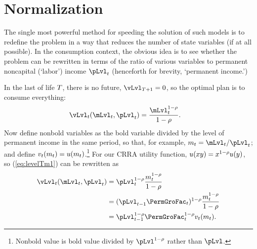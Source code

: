 \hypertarget{normalization}{}
\section{Normalization}\label{sec:normalization}

The single most powerful method for speeding the solution of such models is to redefine the problem in a way that reduces the number of state variables (if at all possible).  In the consumption context, the obvious idea is to see whether the problem can be rewritten in terms of the ratio of various variables to permanent noncapital (`labor') income $\pLvl_{\prd}$ (henceforth for brevity, `permanent income.')

In the last {\interval} of life $T$, there is no future, ${\vLvl}_{\trmT+1} = 0$, so the optimal plan is to consume everything:
\begin{equation}\begin{gathered}\begin{aligned}
      {\vLvl}_{\prdT}(\mLvl_{\prdT},\pLvl_{\prdT})  & = \frac{\mLvl_{\prdT}^{1-\CRRA}}{1-\CRRA}. \label{eq:levelTm1}
    \end{aligned}\end{gathered}\end{equation}
Now define nonbold variables as the bold variable divided by the level of permanent income in the same period, so that, for example, ${\mNrm}_{\prdT}=\mLvl_{\prdT}/\pLvl_{\prdT}$; and define $v_{t}({m}_{t}) = u({m}_{t})$.\footnote{Nonbold value is bold value divided by $\pLvl^{1-\CRRA}$ rather than $\pLvl$.}  For our CRRA utility function, $u(xy)=x^{1-\rho}u(y)$, so (\ref{eq:levelTm1}) can be rewritten as
\begin{equation}\begin{gathered}\begin{aligned}
      {\vLvl}_{\prdT}(\mLvl_{\prdT},\pLvl_{\prdT}) & = \pLvl_{\prdT}^{1-\CRRA}\frac{{\mNrm}_{\prdT}^{1-\CRRA}}{1-\CRRA}                       \\
                                                & = (\pLvl_{\prdT-1}\PermGroFac_{\prdT})^{1-\CRRA}\frac{{\mNrm}_{\prdT}^{1-\CRRA}}{1-\CRRA} \\
                                                &= \pLvl_{\prdT-1}^{1-\CRRA}\PermGroFac_{\prdT}^{1-\CRRA}\vFunc_{\prdT}({\mNrm}_{\prdT}). \label{eq:vT}
    \end{aligned}\end{gathered}\end{equation}

